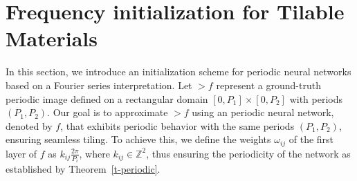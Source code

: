 



\section{Frequency initialization for Tilable Materials}
\label{s-initialization}

In this section, we introduce an initialization scheme for periodic neural networks based on a Fourier series interpretation. Let $\gt{f}$ represent a ground-truth periodic image defined on a rectangular domain $[0, P_1] \times [0, P_2]$ with periods $(P_1, P_2)$. Our goal is to approximate $\gt{f}$ using an periodic neural network, denoted by $f$, that exhibits periodic behavior with the same periods $(P_1, P_2)$, ensuring seamless tiling. To achieve this, we define the weights $\omega_{ij}$ of the first layer of $f$ as $k_{ij}\frac{2\pi}{P_i}$, where $k_{ij}\in \mathbb{Z}^2$, thus ensuring the periodicity of the network as established by Theorem~\ref{t-periodic}.

